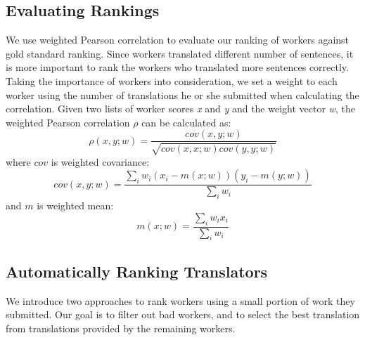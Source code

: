 \documentclass[11pt,letterpaper]{article}
\begin{document}

\subsection{Evaluating Rankings}
We use weighted Pearson correlation \cite{pozzi2012exponential} to evaluate our ranking of workers against gold standard ranking. Since workers translated different number of sentences, it is more important to rank the workers who translated more sentences correctly. Taking the importance of workers into consideration, we set a weight to each worker using the number of translations he or she submitted when calculating the correlation.
Given two lists of worker scores \textit{x} and \textit{y} and the weight vector \textit{w}, the weighted Pearson correlation $\rho$ can be calculated as:
\begin{equation}
\rho(x,y;w) = \frac{cov(x,y;w)}{\sqrt{cov(x,x;w)cov(y,y;w)}}
\end{equation}
where $cov$ is weighted covariance:
\begin{equation}
cov(x,y;w)  = \frac{\sum_i w_i (x_i - m(x;w))(y_i - m(y;w))}{\sum_i w_i}
\end{equation}
and $m$ is weighted mean:
\begin{equation} 
m(x;w)  =  \frac{\sum_{i} w_i x_i}{\sum_i w_i} 
\end{equation}

\subsection{Automatically Ranking Translators}

We introduce two approaches to rank workers using a small portion of work they submitted.  Our goal is to filter out bad workers, and to select the best translation from translations provided by the remaining workers.


\end{document}
